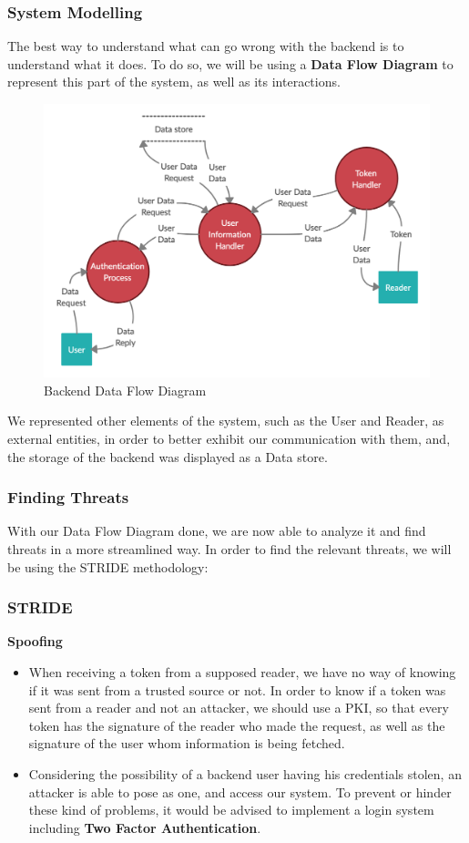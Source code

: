 \subsubsection{System Modelling}

The best way to understand what can go wrong with the backend is to understand what it does. To do so, we will be using a \textbf{Data Flow Diagram} to represent this part of the system, as well as its interactions.

\begin{figure}[ht!]
 	\centering
 	\includegraphics[width=0.7\linewidth]{img/backendDFD.png}
 	\caption{Backend Data Flow Diagram}
 \end{figure}
 
 We represented other elements of the system, such as the User and Reader, as external entities, in order to better exhibit our communication with them, and, the storage of the backend was displayed as a Data store.

\subsubsection{Finding Threats}

With our Data Flow Diagram done, we are now able to analyze it and find threats in a more streamlined way. In order to find the relevant threats, we will be using the STRIDE methodology:

\subsubsection{STRIDE}

\textbf{Spoofing}
\begin{itemize}
    \item When receiving a token from a supposed reader, we have no way of knowing if it was sent from a trusted source or not. In order to know if a token was sent from a reader and not an attacker, we should use a PKI\cite{pki}, so that every token has the signature of the reader who made the request, as well as the signature of the user whom information is being fetched.
    \item Considering the possibility of a backend user having his credentials stolen, an attacker is able to pose as one, and access our system. To prevent or hinder these kind of problems, it would be advised to implement a login system including \textbf{Two Factor Authentication}.
\end{itemize}

